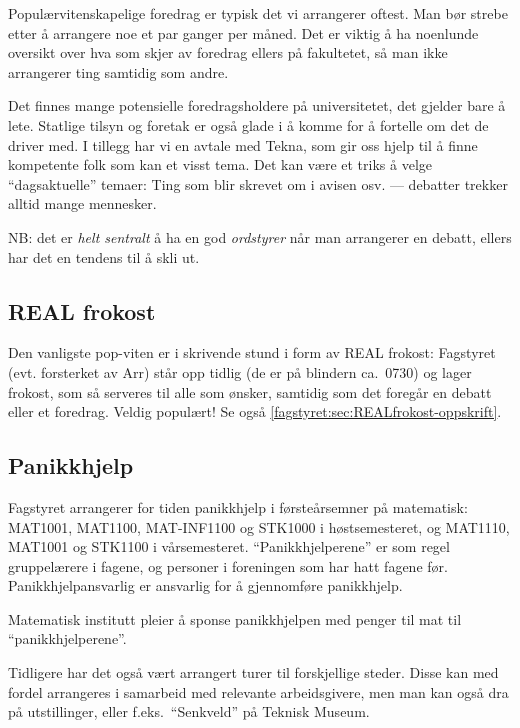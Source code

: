 Populærvitenskapelige foredrag er typisk det vi arrangerer oftest.
Man bør strebe etter å arrangere noe et par ganger per måned.
Det er viktig å ha noenlunde oversikt over hva som skjer av foredrag ellers
på fakultetet, så man ikke arrangerer ting samtidig som andre.

Det finnes mange potensielle foredragsholdere på universitetet, det gjelder bare
å lete.
Statlige tilsyn og foretak er også glade i å komme for å fortelle om det de
driver med.
I tillegg har vi en avtale med Tekna, som gir oss
hjelp til å finne kompetente folk som kan et visst tema. 
Det kan være et triks å velge ``dagsaktuelle'' temaer:
Ting som blir skrevet om i avisen osv. ---
debatter trekker alltid mange mennesker.

NB: det er \emph{helt sentralt} å ha en god \emph{ordstyrer} når man
arrangerer en debatt, ellers har det en tendens til å skli ut.

\subsection{REAL frokost}
Den vanligste pop-viten er i skrivende stund i form av REAL frokost:
Fagstyret (evt. forsterket av Arr) står opp tidlig (de er på blindern
ca.~0730) og lager frokost, som så serveres til alle som ønsker, samtidig som
det foregår en debatt eller et foredrag.
Veldig populært!
Se også \ref{fagstyret:sec:REALfrokost-oppskrift}.

\subsection{Panikkhjelp}
Fagstyret arrangerer for tiden panikkhjelp i første\-års\-emner på matematisk:
MAT1001, MAT1100, MAT-INF1100 og STK1000 i høstsemesteret, og MAT1110, MAT1001
 og STK1100 i vårsemesteret. ``Panikkhjelperene'' er som regel gruppelærere i
fagene, og personer i foreningen som har hatt fagene før.
Panikkhjelpansvarlig er ansvarlig for å gjennomføre panikkhjelp.

Matematisk institutt pleier å sponse panikkhjelpen med penger til mat til
``panikkhjelperene''.

Tidligere har det også vært arrangert turer til forskjellige steder.
Disse kan med fordel arrangeres i samarbeid med relevante arbeidsgivere, 
men man kan også dra på utstillinger,
eller f.eks.~``Senkveld'' på Teknisk Museum.

